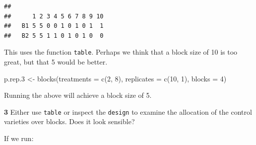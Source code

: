 \documentclass[
]{book}
\makeatletter
\newenvironment{Shaded}{\begin{snugshade}}{\end{snugshade}}
\newcommand{\AttributeTok}[1]{\textcolor[rgb]{0.77,0.63,0.00}{#1}}
\newcommand{\DecValTok}[1]{\textcolor[rgb]{0.00,0.00,0.81}{#1}}
\newcommand{\FloatTok}[1]{\textcolor[rgb]{0.00,0.00,0.81}{#1}}
\newcommand{\FunctionTok}[1]{\textcolor[rgb]{0.00,0.00,0.00}{#1}}
\newcommand{\NormalTok}[1]{#1}
\newcommand{\OtherTok}[1]{\textcolor[rgb]{0.56,0.35,0.01}{#1}}
\newcommand{\SpecialCharTok}[1]{\textcolor[rgb]{0.00,0.00,0.00}{#1}}
\newenvironment{kframe}{%
\medskip{}
\setlength{\fboxsep}{.8em}
 \def\at@end@of@kframe{}%
 \ifinner\ifhmode%
  \def\at@end@of@kframe{\end{minipage}}%
  \begin{minipage}{\columnwidth}%
 \fi\fi%
 \def\FrameCommand##1{\hskip\@totalleftmargin \hskip-\fboxsep
 \colorbox{shadecolor}{##1}\hskip-\fboxsep
     \hskip-\linewidth \hskip-\@totalleftmargin \hskip\columnwidth}%
 \MakeFramed {\advance\hsize-\width
   \@totalleftmargin\z@ \linewidth\hsize
   \@setminipage}}%
 {\par\unskip\endMakeFramed%
 \at@end@of@kframe}
\newenvironment{rmdblock}[1]
  {
  \begin{itemize}
  \renewcommand{\labelitemi}{
    \raisebox{-.7\height}[0pt][0pt]{
      {\setkeys{Gin}{width=3em,keepaspectratio}\texttt{[image: images/\#1]}}
    }
  }
  \setlength{\fboxsep}{1em}
  \begin{kframe}
  \item
  }
  {
  \end{kframe}
  \end{itemize}
  }
\newenvironment{rmdquiz}
  {\begin{rmdblock}{quiz}}
  {\end{rmdblock}}
\makeatother
\begin{document}
\begin{Shaded}
\end{Shaded}

\begin{verbatim}
##     
##      1 2 3 4 5 6 7 8 9 10
##   B1 5 5 0 0 1 0 1 0 1  1
##   B2 5 5 1 1 0 1 0 1 0  0
\end{verbatim}

This uses the function \texttt{table}. Perhaps we think that a block size of 10 is too great, but that 5 would be better.

\begin{Shaded}
\begin{Highlighting}[]
\NormalTok{p.rep}\FloatTok{.3} \OtherTok{\textless{}{-}} \FunctionTok{blocks}\NormalTok{(}\AttributeTok{treatments =} \FunctionTok{c}\NormalTok{(}\DecValTok{2}\NormalTok{, }\DecValTok{8}\NormalTok{), }\AttributeTok{replicates =} \FunctionTok{c}\NormalTok{(}\DecValTok{10}\NormalTok{, }\DecValTok{1}\NormalTok{), }
    \AttributeTok{blocks =} \DecValTok{4}\NormalTok{)}
\end{Highlighting}
\end{Shaded}

Running the above will achieve a block size of 5.

\begin{rmdquiz}
\textbf{3} Either use \texttt{table} or inspect the \texttt{design} to examine the allocation of the control varieties over blocks. Does it look sensible?
\end{rmdquiz}

If we run:

\begin{Shaded}
\end{Shaded}
\end{document}
